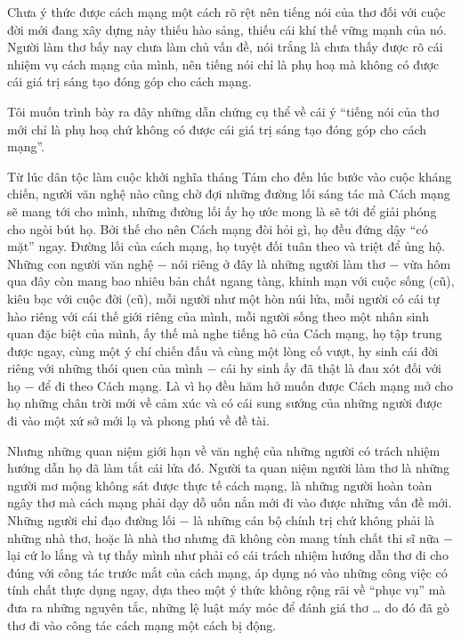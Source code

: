 \documentclass[../main.tex]{subfiles}
\begin{document}
\begin{multicols}{2}
Chưa ý thức được cách mạng một cách rõ rệt nên tiếng nói của thơ đối với cuộc đời mới đang xây dựng này thiếu hào sảng, thiếu cái khí thế vững mạnh của nó. Người làm thơ bấy nay chưa làm chủ vấn đề, nói trắng là chưa thấy được rõ cái nhiệm vụ cách mạng của mình, nên tiếng nói chỉ là phụ hoạ mà không có được cái giá trị sáng tạo đóng góp cho cách mạng. 
 
Tôi muốn trình bày ra đây những dẫn chứng cụ thể về cái ý “tiếng nói của thơ mới chỉ là phụ hoạ chứ không có được cái giá trị sáng tạo đóng góp cho cách mạng”. 
 
Từ lúc dân tộc làm cuộc khởi nghĩa tháng Tám cho đến lúc bước vào cuộc kháng chiến, người văn nghệ nào cũng chờ đợi những đường lối sáng tác mà Cách mạng sẽ mang tới cho mình, những đường lối ấy họ ước mong là sẽ tới để giải phóng cho ngòi bút họ. Bởi thế cho nên Cách mạng đòi hỏi gì, họ đều đứng dậy “có mặt” ngay. Đường lối của cách mạng, họ tuyệt đối tuân theo và triệt để ủng hộ. Những con người văn nghệ − nói riêng ở đây là những người làm thơ − vừa hôm qua đây còn mang bao nhiêu bản chất ngang tàng, khinh mạn với cuộc sống (cũ), kiêu bạc với cuộc đời (cũ), mỗi người như một hòn núi lửa, mỗi người có cái tự hào riêng với cái thế giới riêng của mình, mỗi người sống theo một nhân sinh quan đặc biệt của mình, ấy thế mà nghe tiếng hô của Cách mạng, họ tập trung được ngay, cùng một ý chí chiến đấu và cùng một lòng cố vượt, hy sinh cái đời riêng với những thói quen của mình − cái hy sinh ấy đã thật là đau xót đối với họ − để đi theo Cách mạng. Là vì họ đều hăm hở muốn được Cách mạng mở cho họ những chân trời mới về cảm xúc và có cái sung sướng của những người được đi vào một xứ sở mới lạ và phong phú về đề tài. 
 
Nhưng những quan niệm giới hạn về văn nghệ của những người có trách nhiệm hướng dẫn họ đã làm tắt cái lửa đó. Người ta quan niệm người làm thơ là những người mơ mộng không sát được thực tế cách mạng, là những người hoàn toàn ngây thơ mà cách mạng phải dạy dỗ uốn nắn mới đi vào được những vấn đề mới. Những người chỉ đạo đường lối − là những cán bộ chính trị chứ không phải là những nhà thơ, hoặc là nhà thơ nhưng đã không còn mang tính chất thi sĩ nữa − lại cứ lo lắng và tự thấy mình như phải có cái trách nhiệm hướng dẫn thơ đi cho đúng với công tác trước mắt của cách mạng, áp dụng nó vào những công việc có tính chất thực dụng ngay, dựa theo một ý thức không rộng rãi về “phục vụ” mà đưa ra những nguyên tắc, những lệ luật máy móc để đánh giá thơ … do đó đã gò thơ đi vào công tác cách mạng một cách bị động. 
 

\end{multicols}
\end{document}
